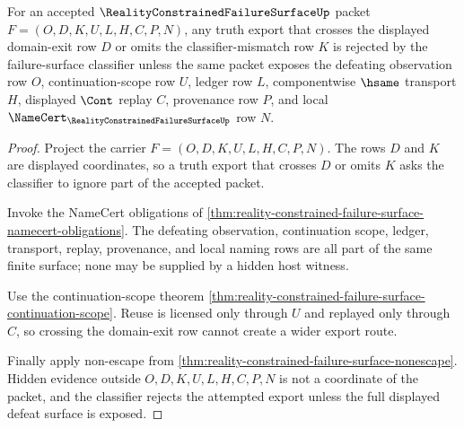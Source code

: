\begin{theorem}
\label{thm:reality-constrained-failure-surface-domain-export-refusal}
For an accepted $\RealityConstrainedFailureSurfaceUp$ packet $F=(O,D,K,U,L,H,C,P,N)$, any truth export that crosses the displayed domain-exit row $D$ or omits the classifier-mismatch row $K$ is rejected by the failure-surface classifier unless the same packet exposes the defeating observation row $O$, continuation-scope row $U$, ledger row $L$, componentwise $\hsame$ transport $H$, displayed $\Cont$ replay $C$, provenance row $P$, and local $\NameCert_{\RealityConstrainedFailureSurfaceUp}$ row $N$.
\end{theorem}
\begin{proof}
Project the carrier $F=(O,D,K,U,L,H,C,P,N)$. The rows $D$ and $K$ are displayed coordinates, so a truth export that crosses $D$ or omits $K$ asks the classifier to ignore part of the accepted packet.

Invoke the NameCert obligations of \autoref{thm:reality-constrained-failure-surface-namecert-obligations}. The defeating observation, continuation scope, ledger, transport, replay, provenance, and local naming rows are all part of the same finite surface; none may be supplied by a hidden host witness.

Use the continuation-scope theorem \autoref{thm:reality-constrained-failure-surface-continuation-scope}. Reuse is licensed only through $U$ and replayed only through $C$, so crossing the domain-exit row cannot create a wider export route.

Finally apply non-escape from \autoref{thm:reality-constrained-failure-surface-nonescape}. Hidden evidence outside $O,D,K,U,L,H,C,P,N$ is not a coordinate of the packet, and the classifier rejects the attempted export unless the full displayed defeat surface is exposed.
\end{proof}

